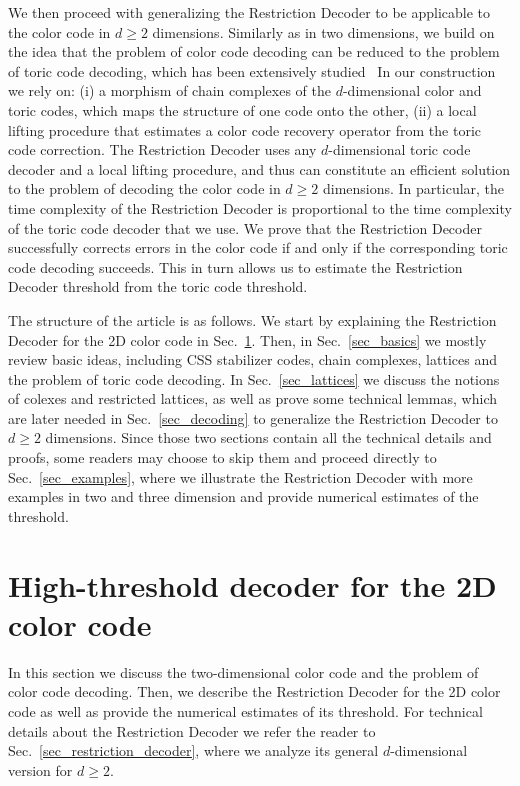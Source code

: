 \documentclass[onecolumn,letterpaper,11pt,accepted=2022-12-19]{quantumarticle}
\theoremstyle{definition}
\theoremstyle{lemma}
\theoremstyle{theorem}
\theoremstyle{corollary}
\begin{document}
We then proceed with generalizing the Restriction Decoder to be applicable to the color code in $d\geq 2$ dimensions.
Similarly as in two dimensions, we build on the idea that the problem of color code decoding can be reduced to the problem of toric code decoding, which has been extensively studied~\cite{Dennis2002,Pastawski2011,Duivenvoorden2017,Breuckmann2017,Breuckmann2017a,Kubica2018toom}
In our construction we rely on:
(i) a morphism of chain complexes of the $d$-dimensional color and toric codes, which maps the structure of one code onto the other,
(ii) a local lifting procedure that estimates a color code recovery operator from the toric code correction.
The Restriction Decoder uses any $d$-dimensional toric code decoder and a local lifting procedure, and thus can constitute an efficient solution to the problem of decoding the color code in $d\geq 2$ dimensions.
In particular, the time complexity of the Restriction Decoder is proportional to the time complexity of the toric code decoder that we use.
We prove that the Restriction Decoder successfully corrects errors in the color code if and only if the corresponding toric code decoding succeeds.
This in turn allows us to estimate the Restriction Decoder threshold from the toric code threshold.


The structure of the article is as follows.
We start by explaining the Restriction Decoder for the 2D color code in Sec.~\ref{sec_2d}.
Then, in Sec.~\ref{sec_basics} we mostly review basic ideas, including CSS stabilizer codes, chain complexes, lattices and the problem of toric code decoding.
In Sec.~\ref{sec_lattices} we discuss the notions of colexes and restricted lattices, as well as prove some technical lemmas, which are later needed in Sec.~\ref{sec_decoding} to generalize the Restriction Decoder to $d\geq 2$ dimensions.
Since those two sections contain all the technical details and proofs, some readers may choose to skip them and proceed directly to Sec.~\ref{sec_examples}, where we illustrate the Restriction Decoder with more examples in two and three dimension and provide numerical estimates of the threshold.



\section{High-threshold decoder for the 2D color code}
\label{sec_2d}


In this section we discuss the two-dimensional color code and the problem of color code decoding.
Then, we describe the Restriction Decoder for the 2D color code as well as provide the numerical estimates of its threshold.
For technical details about the Restriction Decoder we refer the reader to Sec.~\ref{sec_restriction_decoder}, where we analyze its general $d$-dimensional version for $d\geq 2$.
\end{document}
